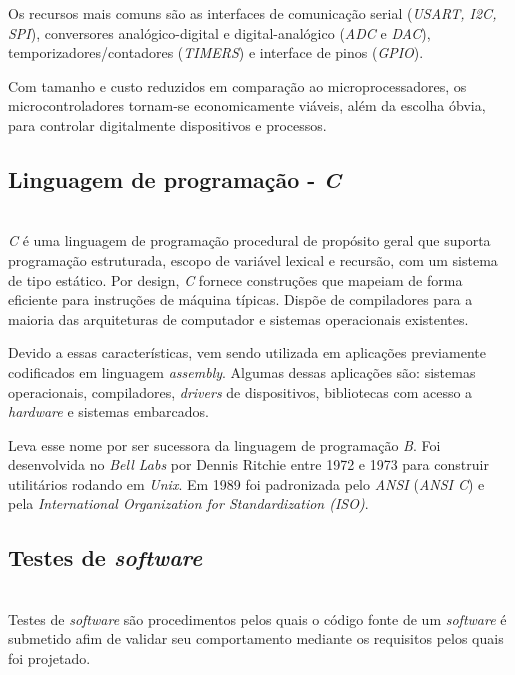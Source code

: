 \documentclass[times, twoside, watermark]{artigo}
\begin{document}
Os recursos mais comuns são as interfaces de comunicação 
serial (\textit{USART, I2C, SPI}), conversores analógico-digital e digital-analógico 
(\textit{ADC} e \textit{DAC}), temporizadores/contadores (\textit{TIMERS}) e 
interface de pinos (\textit{GPIO}).

Com tamanho e custo reduzidos em comparação ao microprocessadores,
os microcontroladores tornam-se economicamente viáveis, além da
escolha óbvia, para controlar digitalmente dispositivos e 
processos\cite{gridling2007introduction}.


\subsection{Linguagem de programação - \textit{C}}\hfill\\

\textit{C} é uma linguagem de programação procedural de propósito geral que 
suporta programação estruturada, escopo de variável lexical e recursão, com um 
sistema de tipo estático. Por design, \textit{C} fornece construções que mapeiam de 
forma eficiente para instruções de máquina típicas. Dispõe de compiladores para a 
maioria das arquiteturas de computador e sistemas operacionais 
existentes.\cite{ritchie1993development}

Devido a essas características, vem  sendo utilizada em aplicações previamente 
codificados em linguagem \textit{assembly}. 
Algumas dessas aplicações são: sistemas operacionais, compiladores,
\textit{drivers} de dispositivos, bibliotecas com acesso a \textit{hardware} e 
sistemas embarcados.

Leva esse nome por ser sucessora da linguagem de programação \textit{B}.
Foi desenvolvida no \textit{Bell Labs} por Dennis Ritchie entre 1972 e 1973 para 
construir utilitários rodando em \textit{Unix}. 
Em 1989 foi padronizada pelo \textit{ANSI} (\textit{ANSI C}) e pela 
\textit{International Organization for Standardization (ISO)}.
\cite{ritchie1993development}

\subsection{Testes de \textit{software}}\hfill\\

Testes de \textit{software} são procedimentos pelos quais o código fonte de um
\textit{software} é submetido afim de validar seu comportamento mediante
os requisitos pelos quais foi projetado.
\end{document}
